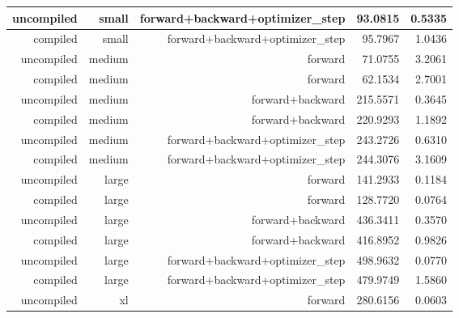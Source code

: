 \documentclass{article}
\begin{document}
\begin{enumerate}[start=1,label=\arabic*.]
\begin{enumerate}
\begin{enumerate}[label=\alph*.]
\begin{table}[h]
\begin{tabular}{|r|r|r|r|r|}
                                \hline
                                uncompiled & small & forward+backward+optimizer\_step & 93.0815 & 0.5335  \\
                                \hline
                                compiled & small & forward+backward+optimizer\_step & 95.7967 & 1.0436 \\
                                \hline
                                uncompiled & medium & forward & 71.0755 & 3.2061  \\
                                \hline
                                compiled & medium & forward & 62.1534 & 2.7001  \\
                                \hline
                                uncompiled & medium & forward+backward & 215.5571 & 0.3645  \\
                                \hline
                                compiled & medium & forward+backward & 220.9293 & 1.1892  \\
                                \hline
                                uncompiled & medium & forward+backward+optimizer\_step & 243.2726 & 0.6310  \\
                                \hline
                                compiled & medium & forward+backward+optimizer\_step & 244.3076 & 3.1609  \\
                                \hline
                                uncompiled & large & forward & 141.2933 & 0.1184 \\
                                \hline
                                compiled & large & forward & 128.7720 & 0.0764 \\
                                \hline
                                uncompiled & large & forward+backward & 436.3411 & 0.3570  \\
                                \hline
                                compiled & large & forward+backward & 416.8952 & 0.9826  \\
                                \hline
                                uncompiled & large & forward+backward+optimizer\_step & 498.9632 & 0.0770  \\
                                \hline
                                compiled & large & forward+backward+optimizer\_step & 479.9749 & 1.5860  \\
                                \hline
                                uncompiled & xl & forward & 280.6156 & 0.0603 \\

\end{tabular}
\end{table}
\end{enumerate}
\end{enumerate}
\end{enumerate}
\end{document}
